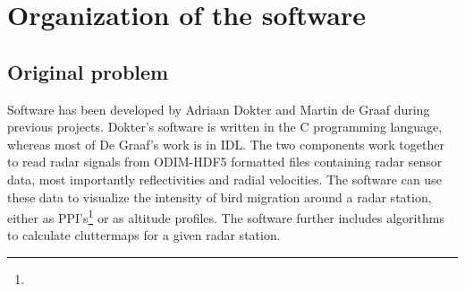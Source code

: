 \chapter{Organization of the software}
\label{ch:design-philosophy}


\section{Original problem}

Software has been developed by Adriaan Dokter and Martin de Graaf during previous projects. Dokter's software is written in the C programming language, whereas most of De Graaf's work is in IDL. The two components work together to read radar signals from ODIM-HDF5 formatted files containing radar sensor data, most importantly reflectivities and radial velocities. The software can use these data to visualize the intensity of bird migration around a radar station, either as PPI's\footnote{} or as altitude profiles. The software further includes algorithms to calculate cluttermaps for a given radar station.

